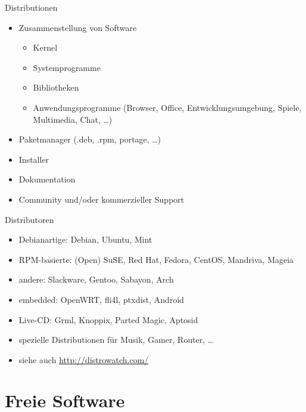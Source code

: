\documentclass{beamer}
\begin{document}
\begin{frame}{Distributionen}
    \begin{itemize}
        \item Zusammenstellung von Software
            \begin{itemize}
                \item Kernel
                \item Systemprogramme
                \item Bibliotheken
                \item Anwendungsprogramme (Browser, Office, 
                    Entwicklungsumgebung, Spiele, Multimedia, Chat, …)
            \end{itemize}
        \pause
        \item Paketmanager (.deb, .rpm, portage, …)
        \pause
        \item Installer
        \item Dokumentation
        \item Community und/oder kommerzieller Support
    \end{itemize}
\end{frame}

\begin{frame}{Distributoren}
    \begin{itemize}
        \item Debianartige: Debian, Ubuntu, Mint
        \pause
        \item RPM-basierte: (Open) SuSE, Red Hat, Fedora, CentOS,
            Mandriva, Mageia
        \pause
        \item andere: Slackware, Gentoo, Sabayon, Arch
        \pause
        \item embedded: OpenWRT, fli4l, ptxdist, Android
        \pause
        \item Live-CD: Grml, Knoppix, Parted Magic, Aptosid
        \pause
        \item spezielle Distributionen für Musik, Gamer, Router, …
        \item siehe auch \url{http://distrowatch.com/}
    \end{itemize}
\end{frame}

\section{Freie Software}
\end{document}
